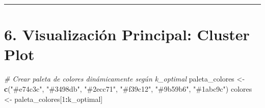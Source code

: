 \documentclass[
]{article}
\newenvironment{Shaded}{\begin{snugshade}}{\end{snugshade}}
\newcommand{\CommentTok}[1]{\textcolor[rgb]{0.56,0.35,0.01}{\textit{#1}}}
\newcommand{\DecValTok}[1]{\textcolor[rgb]{0.00,0.00,0.81}{#1}}
\newcommand{\FunctionTok}[1]{\textcolor[rgb]{0.13,0.29,0.53}{\textbf{#1}}}
\newcommand{\NormalTok}[1]{#1}
\newcommand{\OtherTok}[1]{\textcolor[rgb]{0.56,0.35,0.01}{#1}}
\newcommand{\SpecialCharTok}[1]{\textcolor[rgb]{0.81,0.36,0.00}{\textbf{#1}}}
\newcommand{\StringTok}[1]{\textcolor[rgb]{0.31,0.60,0.02}{#1}}
\begin{document}
\begin{center}\rule{0.5\linewidth}{0.5pt}\end{center}

\section{6. Visualización Principal: Cluster
Plot}\label{visualizaciuxf3n-principal-cluster-plot}

\begin{Shaded}
\begin{Highlighting}[]
\CommentTok{\# Crear paleta de colores dinámicamente según k\_optimal}
\NormalTok{paleta\_colores }\OtherTok{\textless{}{-}} \FunctionTok{c}\NormalTok{(}\StringTok{"\#e74c3c"}\NormalTok{, }\StringTok{"\#3498db"}\NormalTok{, }\StringTok{"\#2ecc71"}\NormalTok{, }\StringTok{"\#f39c12"}\NormalTok{, }\StringTok{"\#9b59b6"}\NormalTok{, }\StringTok{"\#1abc9c"}\NormalTok{)}
\NormalTok{colores }\OtherTok{\textless{}{-}}\NormalTok{ paleta\_colores[}\DecValTok{1}\SpecialCharTok{:}\NormalTok{k\_optimal]}


\end{Highlighting}
\end{Shaded}
\end{document}
